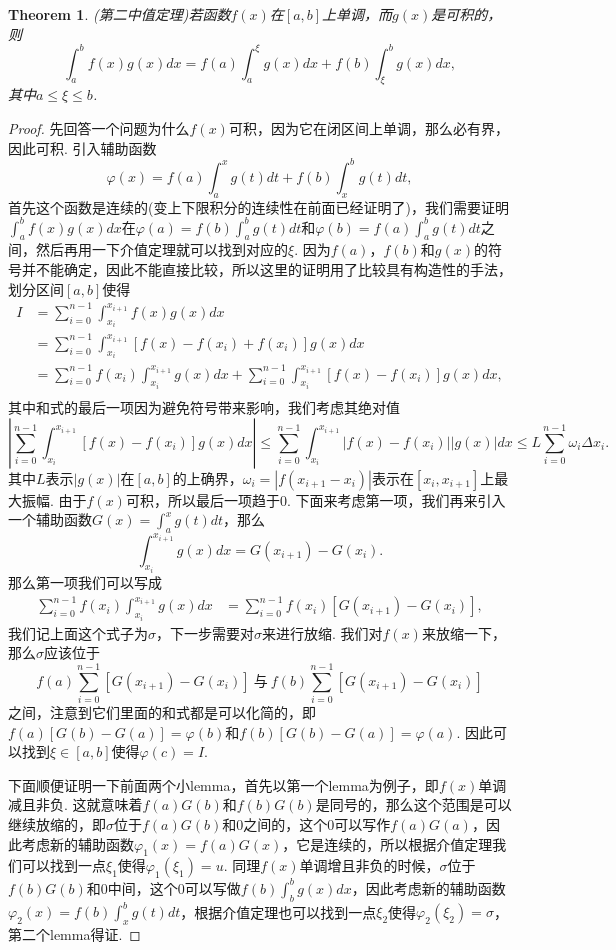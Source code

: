 \documentclass{article}
\newtheorem{theorem}{Theorem}[section]
\begin{document}
\begin{theorem}
\rm {\color{red} (第二中值定理)}若函数$f(x)$在$[a,b]$上单调，而$g(x)$是可积的，则
$$
\int_a^b f(x)g(x)dx = f(a) \int_a^\xi g(x)dx + f(b) \int_\xi^b g(x)dx,
$$
其中$a \leq \xi \leq b$.
\end{theorem}

\begin{proof}
{\color{blue}先回答一个问题为什么$f(x)$可积}，因为它在闭区间上单调，那么必有界，因此可积. 引入辅助函数
$$
\varphi(x) = f(a)\int_a^x g(t)dt + f(b)\int_x^b g(t)dt,
$$
首先这个函数是连续的(变上下限积分的连续性在前面已经证明了)，我们需要证明
$\int_a^b f(x)g(x)dx$在$\varphi(a) = f(b)\int_a^b g(t)dt$和$\varphi(b) = f(a) \int_a^b g(t)dt$之间，然后再用一下介值定理就可以找到对应的$\xi$. 因为{\color{blue}$f(a)$，$f(b)$和$g(x)$的符号并不能确定，因此不能直接比较}，所以这里的证明用了比较具有构造性的手法，划分区间$[a,b]$使得
$$
\begin{array}{ll}
I &= \sum\limits_{i=0}^{n-1}\int_{x_i}^{x_{i+1}} f(x)g(x)dx \\
&= \sum\limits_{i=0}^{n-1}\int_{x_i}^{x_{i+1}}\left[ f(x)-f(x_i)+f(x_i)\right]g(x)dx \\
&= \sum\limits_{i=0}^{n-1} f(x_i) \int_{x_i}^{x_{i+1}}g(x)dx + \sum\limits_{i=0}^{n-1}\int_{x_i}^{x_{i+1}}\left[ f(x)-f(x_i)\right]g(x)dx, \\
\end{array}
$$
其中和式的最后一项因为避免符号带来影响，我们考虑其绝对值
$$
\left|\sum\limits_{i=0}^{n-1}\int_{x_i}^{x_{i+1}}\left[ f(x)-f(x_i)\right]g(x)dx \right| \leq \sum\limits_{i=0}^{n-1}\int_{x_i}^{x_{i+1}}\left| f(x)-f(x_i)\right||g(x)|dx \leq L \sum\limits_{i=0}^{n-1} \omega_i\Delta x_i. 
$$
其中$L$表示$|g(x)|$在$[a,b]$的上确界，$\omega_i=|f(x_{i+1}-x_i)|$表示在$[x_i,x_{i+1}]$上最大振幅. 由于$f(x)$可积，所以最后一项趋于$0$. 下面来考虑第一项，我们再来引入一个辅助函数$G(x) = \int_a^x g(t)dt$，那么
$$
\int_{x_i}^{x_{i+1}} g(x)dx = G(x_{i+1})-G(x_{i}).
$$
那么第一项我们可以写成
$$
\begin{array}{ll}
\sum\limits_{i=0}^{n-1} f(x_i) \int_{x_i}^{x_{i+1}}g(x)dx &= \sum\limits_{i=0}^{n-1} f(x_i)\left[ G(x_{i+1})-G(x_{i})\right],
\end{array}
$$
我们记上面这个式子为$\sigma$，下一步需要对$\sigma$来进行放缩. 我们对$f(x)$来放缩一下，那么$\sigma$应该位于
$$
f(a)\sum\limits_{i=0}^{n-1} \left[ G(x_{i+1})-G(x_{i})\right]~\text{与}~f(b)\sum\limits_{i=0}^{n-1} \left[ G(x_{i+1})-G(x_{i})\right]
$$之间，注意到它们里面的和式都是可以化简的，即$f(a)[G(b)-G(a)]= \varphi(b)$和$f(b)[G(b)-G(a)]=\varphi(a)$. 因此可以找到$\xi \in [a,b]$使得$\varphi(c)=I$. 

下面顺便证明一下前面两个小lemma，首先以第一个lemma为例子，即$f(x)$单调减且非负.     这就意味着$f(a)G(b)$和$f(b)G(b)$是同号的，那么这个范围是可以继续放缩的，即$\sigma$位于$f(a)G(b)$和$0$之间的，这个$0$可以写作$f(a)G(a)$，因此考虑新的辅助函数$\varphi_1(x)=f(a)G(x)$，它是连续的，所以根据介值定理我们可以找到一点$\xi_1$使得$\varphi_1(\xi_1) = u$. 同理$f(x)$单调增且非负的时候，$\sigma$位于$f(b)G(b)$和$0$中间，这个$0$可以写做$f(b)\int_b^{b} g(x)dx$，因此考虑新的辅助函数$\varphi_2(x) = f(b)\int_{x}^b g(t)dt$，根据介值定理也可以找到一点$\xi_2$使得$\varphi_2(\xi_2) = \sigma$，第二个lemma得证.
\end{proof}
\end{document}
